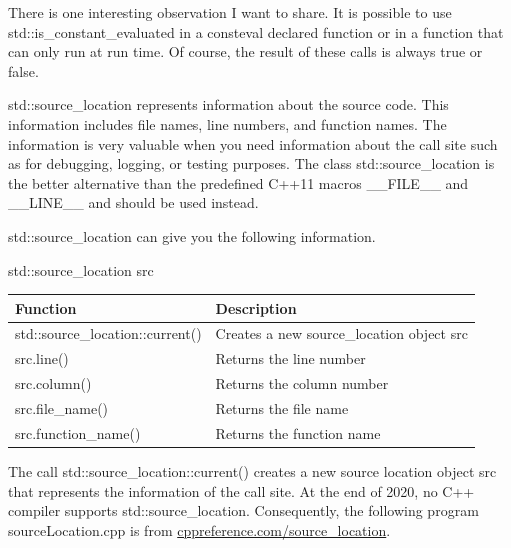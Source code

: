 There is one interesting observation I want to share. It is possible to use std::is\_constant\_evaluated in a consteval declared function or in a function that can only run at run time. Of course, the result of these calls is always true or false.


std::source\_location represents information about the source code. This information includes file names, line numbers, and function names. The information is very valuable when you need information about the call site such as for debugging, logging, or testing purposes. The class std::source\_location is the better alternative than the predefined C++11 macros \_\_FILE\_\_ and \_\_LINE\_\_ and should be used instead.

std::source\_location can give you the following information.

\begin{center}
std::source\_location src
\end{center}

\begin{table}[H]
\centering
\begin{tabular}{ll}
\textbf{Function}                & \textbf{Description}                      \\ \hline
std::source\_location::current() & Creates a new source\_location object src \\
src.line()                       & Returns the line number                   \\
src.column()                     & Returns the column number                 \\
src.file\_name()                 & Returns the file name                     \\
src.function\_name()             & Returns the function name                
\end{tabular}
\end{table}

The call std::source\_location::current() creates a new source location object src that represents the information of the call site. At the end of 2020, no C++ compiler supports std::source\_location. Consequently, the following program sourceLocation.cpp is from \href{https://en.cppreference.com/w/cpp/utility/source_location}{cppreference.com/source\_location}.

